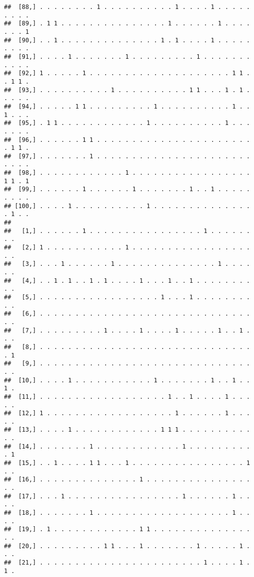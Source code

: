 \documentclass{article}\usepackage[]{graphicx}\usepackage[]{color}
\makeatletter
\newenvironment{kframe}{%
 \def\at@end@of@kframe{}%
 \ifinner\ifhmode%
  \def\at@end@of@kframe{\end{minipage}}%
  \begin{minipage}{\columnwidth}%
 \fi\fi%
 \def\FrameCommand##1{\hskip\@totalleftmargin \hskip-\fboxsep
 \colorbox{shadecolor}{##1}\hskip-\fboxsep
     \hskip-\linewidth \hskip-\@totalleftmargin \hskip\columnwidth}%
 \MakeFramed {\advance\hsize-\width
   \@totalleftmargin\z@ \linewidth\hsize
   \@setminipage}}%
 {\par\unskip\endMakeFramed%
 \at@end@of@kframe}
\newenvironment{knitrout}{}{} %
\makeatother
\begin{document}
\begin{knitrout}
\begin{kframe}
\begin{verbatim}
##  [88,] . . . . . . . . 1 . . . . . . . . . . 1 . . . . 1 . . . . . . . . .
##  [89,] . 1 1 . . . . . . . . . . . . . . . 1 . . . . . . 1 . . . . . . . 1
##  [90,] . . 1 . . . . . . . . . . . . . . 1 . 1 . . . . 1 . . . . . . . . .
##  [91,] . . . . 1 . . . . . . . 1 . . . . . . . . . 1 . . . . . . . . . . .
##  [92,] 1 . . . . . 1 . . . . . . . . . . . . . . . . . . . . 1 1 . . 1 1 .
##  [93,] . . . . . . . . . . 1 . . . . . . . . . . 1 1 . . . 1 . 1 . . . . .
##  [94,] . . . . . 1 1 . . . . . . . . . 1 . . . . . . . . . . 1 . . 1 . . .
##  [95,] . 1 1 . . . . . . . . . . . . 1 . . . . . . . . . . 1 . . . . . . .
##  [96,] . . . . . . 1 1 . . . . . . . . . . . . . . . . . . . . . . . 1 1 .
##  [97,] . . . . . . . 1 . . . . . . . . . . . . . . . . . . . . . . . . . .
##  [98,] . . . . . . . . . . . . 1 . . . . . . . . . . . . . . . . . 1 1 . 1
##  [99,] . . . . . . 1 . . . . . . 1 . . . . . . . 1 . . 1 . . . . . . . . .
## [100,] . . . . 1 . . . . . . . . . . 1 . . . . . . . . . . . . . . . 1 . .
##                                                                       
##   [1,] . . . . . . 1 . . . . . . . . . . . . . . . . 1 . . . . . . . .
##   [2,] 1 . . . . . . . . . . . 1 . . . . . . . . . . . . . . . . . . .
##   [3,] . . . 1 . . . . . . 1 . . . . . . . . . . . . . . 1 . . . . . .
##   [4,] . . 1 . 1 . . 1 . 1 . . . . 1 . . . 1 . . 1 . . . . . . . . . .
##   [5,] . . . . . . . . . . . . . . . . . 1 . . . 1 . . . . . . . . . .
##   [6,] . . . . . . . . . . . . . . . . . . . . . . . . . . . . . . . .
##   [7,] . . . . . . . . . 1 . . . . 1 . . . . 1 . . . . . 1 . . 1 . . .
##   [8,] . . . . . . . . . . . . . . . . . . . . . . . . . . . . . . . 1
##   [9,] . . . . . . . . . . . . . . . . . . . . . . . . . . . . . . . .
##  [10,] . . . . 1 . . . . . . . . . . . 1 . . . . . . . 1 . . 1 . . 1 .
##  [11,] . . . . . . . . . . . . . . . . . . 1 . . 1 . . . . 1 . . . . .
##  [12,] 1 . . . . . . . . . . . . . . . . . . 1 . . . . . . 1 . . . . .
##  [13,] . . . . 1 . . . . . . . . . . . . 1 1 1 . . . . . . . . . . . .
##  [14,] . . . . . . . 1 . . . . . . . . . . . . 1 . . . . . . . . . . 1
##  [15,] . . 1 . . . . 1 1 . . . 1 . . . . . . . . . . . . . . . . 1 . .
##  [16,] . . . . . . . . . . . . . . 1 . . . . . . . . . . . . . . . . .
##  [17,] . . . 1 . . . . . . . . . . . . . . . . 1 . . . . . . 1 . . . .
##  [18,] . . . . . . . 1 . . . . . . . . . . . . . . . . . . . 1 . . . .
##  [19,] . 1 . . . . . . . . . . . . 1 1 . . . . . . . . . . . . . . . .
##  [20,] . . . . . . . . . 1 1 . . . 1 . . . . . . . 1 . . . . . 1 . . .
##  [21,] . . . . . . . . . . . . . . . . . . . . . . . 1 . . . . 1 . 1 .

\end{verbatim}
\end{kframe}
\end{knitrout}
\end{document}
